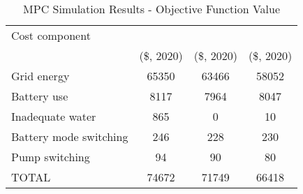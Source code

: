\begin{table}[!htb]
	\caption{MPC Simulation Results - Objective Function Value}
	\label{table:mpc-simulation-results}
	\centering
	\setlength\tabcolsep{0.6mm}
	\begin{tabular}{lS[table-format=5]S[table-format=5]S[table-format=5]}
		\toprule
		  Cost component
          & {} & {} & {} \\
		  & {(\$, 2020)} & {(\$, 2020)}                    & {(\$, 2020)} \\
		\midrule
		Grid energy            & 65350 & 63466 & 58052 \\
		Battery use            &  8117 &  7964 &  8047 \\
		Inadequate water       &   865 &    0 &    10 \\
		Battery mode switching &   246 &   228 &   230 \\
		Pump switching         &    94 &    90 &    80 \\
		\midrule
		TOTAL                  & 74672 & 71749 & 66418 \\
		\bottomrule
	\end{tabular}
\end{table}

